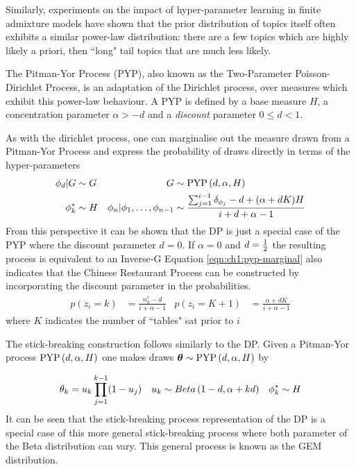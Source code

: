 Similarly, experiments on the impact of hyper-parameter learning in finite admixture models have shown that the prior distribution of topics itself often exhibits a similar power-law distribution: there are a few topics which are highly likely a priori, then ``long" tail topics that are  much less likely\cite{Wallach2009a}.

The Pitman-Yor Process (PYP), also known as the Two-Parameter Poisson-Dirichlet Process, is an adaptation of the Dirichlet process, over measures which exhibit this power-law behaviour. A PYP is defined by a base measure $H$, a concentration parameter $\alpha > -d$ and a \emph{discount} parameter $0 \leq d < 1$. 

As with the dirichlet process, one can marginalise out the measure drawn from a Pitman-Yor Process and express the probability of draws directly in terms of the hyper-parameters
\begin{align}
\phi_d|G & \sim G &
G & \sim \text{PYP} \left( {d, \alpha, H} \right) \\
\phi^*_k &\sim H &
\phi_n | \phi_1, \ldots, \phi_{n-1} & \sim 
    \frac{\sum_{j=1}^{i-1} \delta_{\phi_j} - d + (\alpha + dK) H}{i + d + \alpha - 1} \label{eqn:ch1:pyp-marginal}
\end{align}
From this perspective it can be shown that the DP is just a special case of the PYP where the discount parameter $d=0$. If $\alpha = 0$ and $d=\frac{1}{2}$ the resulting process is equivalent to an Inverse-G Equation \eqref{eqn:ch1:pyp-marginal} also indicates that the Chinese Restaurant Process can be constructed by incorporating the discount parameter in the probabilities.
\begin{align}
p(z_i = k) & = \frac{n^i_k - d}{i + \alpha - 1} &
p(z_i = K + 1) & = \frac{\alpha + dK}{i + \alpha - 1}
\end{align}
where $K$ indicates the number of ``tables" sat prior to $i$


The stick-breaking construction follows similarly to the DP. Given a Pitman-Yor process $\text{PYP} \left( {d, \alpha, H} \right)$ one makes draws $\bm \theta \sim \text{PYP} \left( {d, \alpha, H} \right)$ by

\begin{align}
\theta_k & = u_k \prod_{j=1}^{k-1} (1 - u_j) &
u_k & \sim Beta \left( {1-d}, {\alpha + kd} \right) &
\phi^*_k \sim H
\end{align}
It can be seen that the stick-breaking process representation of the DP is a special case of this more general stick-breaking process where both parameter of the Beta distribution can vary. This general process is known as the GEM distribution\cite{Pitman2002}.


